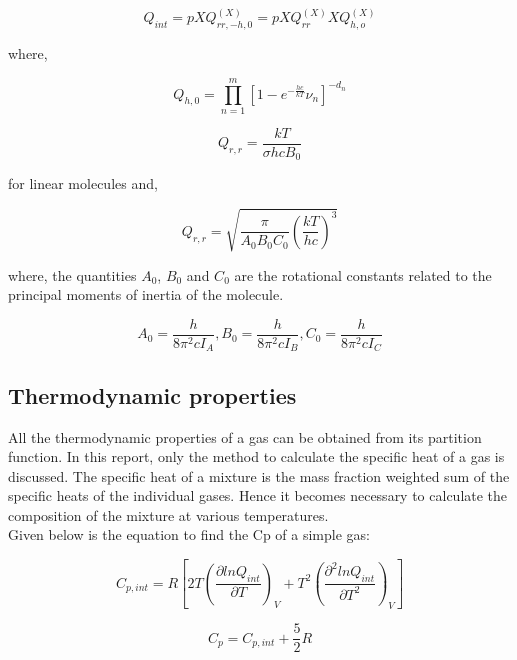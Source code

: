 \documentclass[]{aelab_aiaa-tc}%
\begin{document}
\begin{equation}
Q_{int} = pXQ_{rr,-h,0}^{(X)} = pXQ_{rr}^{(X)}XQ_{h,o}^{(X)}
\end{equation}

where,

\begin{equation}
Q_{h,0} = \prod\limits_{n=1}^{m}\left[1 - e^{-\frac{hc}{kT}}\nu_{n}\right]^{-d_{n}} 
\end{equation}

\begin{equation}
Q_{r,r} = \frac{kT}{\sigma hcB_{0}}
\end{equation}

for linear molecules and,


\begin{equation}
Q_{r,r} = \sqrt{\frac{\pi}{A_{0}B_{0}C_{0}}\left(\frac{kT}{hc}\right)^3}
\end{equation}

where, the quantities $A_0$, $B_0$ and $C_0$ are the rotational constants related to the principal moments of inertia of the molecule.

\begin{equation}
A_{0} = \frac{h}{8\pi^2cI_{A}}, B_{0} = \frac{h}{8\pi^2cI_{B}}, C_{0} = \frac{h}{8\pi^2cI_{C}}
\end{equation}


\subsection{Thermodynamic properties}

All the thermodynamic properties of a gas can be obtained from its partition function. In this report, only the method to calculate the specific heat of a gas is discussed. The specific heat of a mixture is the mass fraction weighted sum of the specific heats of the individual gases. Hence it becomes necessary to calculate the composition of the mixture at various temperatures. \\

Given below is the equation to find the Cp of a simple gas:


\begin{equation}
C_{p,int} = R\left[2T\left(\frac{\partial ln Q_{int}}{\partial T}\right)_{V} + T^2\left(\frac{\partial^2 ln Q_{int}}{\partial T^2}\right)_{V}\right]
\end{equation}

\begin{equation}
C_{p} = C_{p,int} + \frac{5}{2}R
\end{equation}
\end{document}
